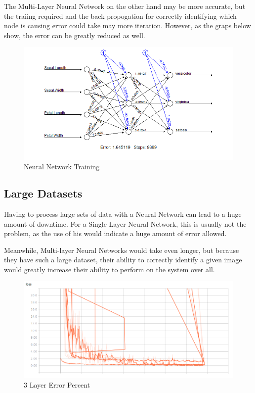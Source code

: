 \documentclass{article}
\begin{document}
The Multi-Layer Neural Network on the other hand may be more accurate, but the traiing required and the back propogation for correctly identifying which node is causing error could take may more iteration. However, as the graps below show, the error can be greatly reduced as well.

\begin{figure}[h]
  \centering
  \includegraphics[width=\textwidth]{pics/training.png}
  \caption{Neural Network Training}
\end{figure}

\subsection{Large Datasets}

Having to process large sets of data with a Neural Network can lead to a huge amount of downtime. For a Single Layer Neural Network, this is usually not the problem, as the use of his would indicate a huge amount of error allowed. 

Meanwhile, Multi-layer Neural Networks would take even longer, but because they have such a large dataset, their ability to correctly identify a given image would greatly increase their ability to perform on the system over all. 

\begin{figure}[h]
  \centering
  \includegraphics[width=\textwidth]{pics/3layererror.png}
  \caption{3 Layer Error Percent}
\end{figure}
\end{document}
